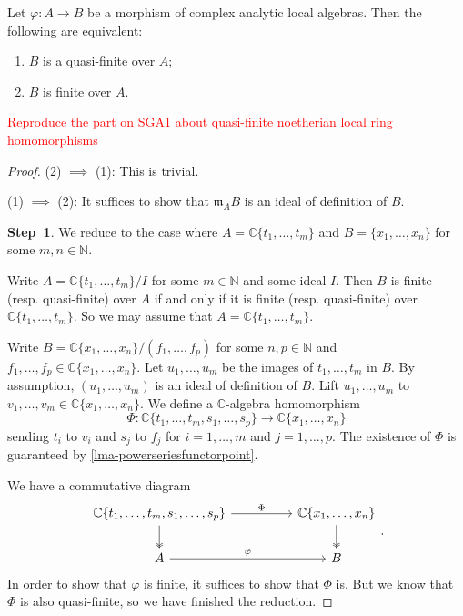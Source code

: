 \begin{thm}\label{thm-analyticquasifiniteifffinite}
    Let $\varphi:A\rightarrow B$ be a morphism of complex analytic local algebras. Then the following are equivalent:
    \begin{enumerate}
        \item $B$ is a quasi-finite over $A$;
        \item $B$ is finite over $A$.
    \end{enumerate}
\end{thm}
\textcolor{red}{Reproduce the part on SGA1 about quasi-finite noetherian local ring homomorphisms}
\begin{proof}
    (2) $\implies$ (1): This is trivial.

    (1) $\implies$ (2): It suffices to show that $\mathfrak{m}_AB$ is an ideal of definition of $B$.
    
    \textbf{Step~1}. We reduce to the case where $A=\mathbb{C}\{t_1,\ldots,t_m\}$ and $B=\{x_1,\ldots,x_n\}$ for some $m,n\in \mathbb{N}$.

    Write $A=\mathbb{C}\{t_1,\ldots,t_m\}/I$ for some $m\in \mathbb{N}$ and some ideal $I$. Then $B$ is finite (resp. quasi-finite) over $A$ if and only if it is finite (resp. quasi-finite) over $\mathbb{C}\{t_1,\ldots,t_m\}$. So we may assume that $A=\mathbb{C}\{t_1,\ldots,t_m\}$.

    Write $B=\mathbb{C}\{x_1,\ldots,x_n\}/(f_1,\ldots,f_p)$ for some $n,p\in \mathbb{N}$ and $f_1,\ldots,f_p\in \mathbb{C}\{x_1,\ldots,x_n\}$. Let $u_1,\ldots,u_m$ be the images of $t_1,\ldots,t_m$ in $B$. By assumption, $(u_1,\ldots,u_m)$ is an ideal of definition of $B$. Lift $u_1,\ldots,u_m$ to $v_1,\ldots,v_m\in \mathbb{C}\{x_1,\ldots,x_n\}$. We define a $\mathbb{C}$-algebra homomorphism
    \[
        \Phi:\mathbb{C}\{t_1,\ldots,t_m,s_1,\ldots,s_p\}\rightarrow  \mathbb{C}\{x_1,\ldots,x_n\} 
    \]
    sending $t_i$ to $v_i$ and $s_j$ to $f_j$ for $i=1,\ldots,m$ and $j=1,\ldots,p$. The existence of $\Phi$ is guaranteed by \cref{lma-powerseriesfunctorpoint}.
    
    We have a commutative diagram
    \[
        \begin{tikzcd}
            {\mathbb{C}\{t_1,\ldots,t_m,s_1,\ldots,s_p\}} \arrow[rr, "\Phi"] \arrow[d, two heads] &  & {\mathbb{C}\{x_1,\ldots,x_n\}} \arrow[d, two heads] \\
            A \arrow[rr, "\varphi"]                                                               &  & B                                                  
        \end{tikzcd}.  
    \]
    In order to show that $\varphi$ is finite, it suffices to show that $\Phi$ is. But we know that $\Phi$ is also quasi-finite, so we have finished the reduction.


\end{proof}
